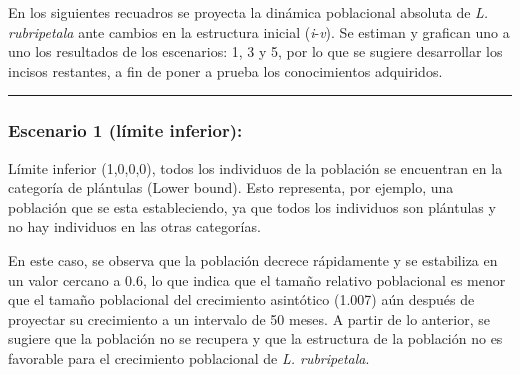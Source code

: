 \documentclass[
  12pt,
  letterpaper,
]{book}
\begin{document}
En los siguientes recuadros se proyecta la dinámica poblacional absoluta
de \emph{L. rubripetala} ante cambios en la estructura inicial
(\emph{i}-\emph{v}). Se estiman y grafican uno a uno los resultados de
los escenarios: 1, 3 y 5, por lo que se sugiere desarrollar los incisos
restantes, a fin de poner a prueba los conocimientos adquiridos.

\begin{center}\rule{0.5\linewidth}{0.5pt}\end{center}

\subsubsection{Escenario 1 (límite
inferior):}\label{escenario-1-luxedmite-inferior}

Límite inferior (1,0,0,0), todos los individuos de la población se
encuentran en la categoría de plántulas (Lower bound). Esto representa,
por ejemplo, una población que se esta estableciendo, ya que todos los
individuos son plántulas y no hay individuos en las otras categorías.

En este caso, se observa que la población decrece rápidamente y se
estabiliza en un valor cercano a 0.6, lo que indica que el tamaño
relativo poblacional es menor que el tamaño poblacional del crecimiento
asintótico (1.007) aún después de proyectar su crecimiento a un
intervalo de 50 meses. A partir de lo anterior, se sugiere que la
población no se recupera y que la estructura de la población no es
favorable para el crecimiento poblacional de \emph{L. rubripetala}.
\end{document}
